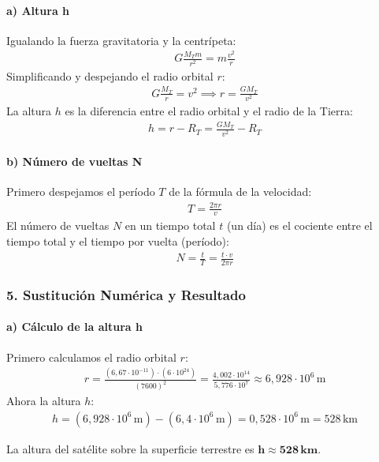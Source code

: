 \paragraph*{a) Altura h}
Igualando la fuerza gravitatoria y la centrípeta:
\begin{gather}
    G \frac{M_T m}{r^2} = m \frac{v^2}{r}
\end{gather}
Simplificando y despejando el radio orbital $r$:
\begin{gather}
    G \frac{M_T}{r} = v^2 \implies r = \frac{G M_T}{v^2}
\end{gather}
La altura $h$ es la diferencia entre el radio orbital y el radio de la Tierra:
\begin{gather}
    h = r - R_T = \frac{G M_T}{v^2} - R_T
\end{gather}
\paragraph*{b) Número de vueltas N}
Primero despejamos el período $T$ de la fórmula de la velocidad:
\begin{gather}
    T = \frac{2\pi r}{v}
\end{gather}
El número de vueltas $N$ en un tiempo total $t$ (un día) es el cociente entre el tiempo total y el tiempo por vuelta (período):
\begin{gather}
    N = \frac{t}{T} = \frac{t \cdot v}{2\pi r}
\end{gather}

\subsubsection*{5. Sustitución Numérica y Resultado}
\paragraph*{a) Cálculo de la altura h}
Primero calculamos el radio orbital $r$:
\begin{gather}
    r = \frac{(6,67\cdot10^{-11}) \cdot (6\cdot10^{24})}{(7600)^2} = \frac{4,002\cdot10^{14}}{5,776\cdot10^7} \approx 6,928\cdot10^6\,\text{m}
\end{gather}
Ahora la altura $h$:
\begin{gather}
    h = (6,928\cdot10^6\,\text{m}) - (6,4\cdot10^6\,\text{m}) = 0,528\cdot10^6\,\text{m} = 528\,\text{km}
\end{gather}
\begin{cajaresultado}
    La altura del satélite sobre la superficie terrestre es $\boldsymbol{h \approx 528\,\textbf{km}}$.
\end{cajaresultado}
